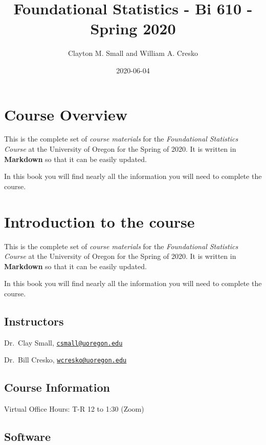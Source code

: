 \documentclass[]{book}
\title{Foundational Statistics - Bi 610 - Spring 2020}
\author{Clayton M. Small and William A. Cresko}
\date{2020-06-04}
\begin{document}
\maketitle

{
\setcounter{tocdepth}{1}
\tableofcontents
}
\hypertarget{course-overview}{%
\chapter{Course Overview}\label{course-overview}}

This is the complete set of \emph{course materials} for the \emph{Foundational Statistics Course} at the University of Oregon for the Spring of 2020. It is written in \textbf{Markdown} so that it can be easily updated.

In this book you will find nearly all the information you will need to complete the course.

\hypertarget{introduction-to-the-course}{%
\chapter{Introduction to the course}\label{introduction-to-the-course}}

This is the complete set of \emph{course materials} for the \emph{Foundational Statistics Course} at the University of Oregon for the Spring of 2020. It is written in \textbf{Markdown} so that it can be easily updated.

In this book you will find nearly all the information you will need to complete the course.

\hypertarget{instructors}{%
\section{Instructors}\label{instructors}}

Dr.~Clay Small, \href{mailto:csmall@uoregon.edu}{\nolinkurl{csmall@uoregon.edu}}

Dr.~Bill Cresko, \href{mailto:wcresko@uoregon.edu}{\nolinkurl{wcresko@uoregon.edu}}

\hypertarget{course-information}{%
\section{Course Information}\label{course-information}}

Virtual Office Hours: T-R 12 to 1:30 (Zoom)

\hypertarget{software}{%
\section{Software}\label{software}}
\end{document}
